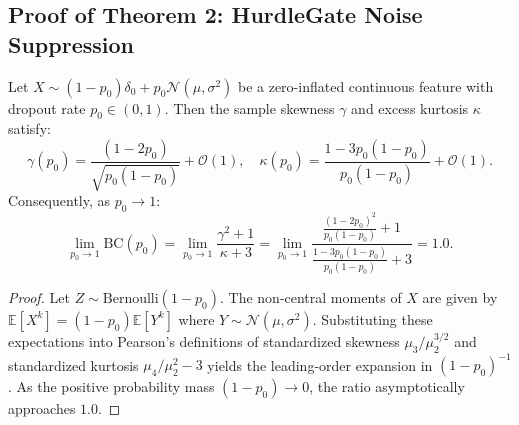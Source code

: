 \subsection{Proof of Theorem 2: HurdleGate Noise Suppression}

\begin{lemma}\label{lem:moment_divergence}
Let $X \sim (1 - p_0)\delta_0 + p_0 \mathcal{N}(\mu, \sigma^2)$ be a zero-inflated continuous feature with dropout rate $p_0 \in (0, 1)$. Then the sample skewness $\gamma$ and excess kurtosis $\kappa$ satisfy:
\begin{equation}
    \gamma(p_0) = \frac{(1 - 2p_0)}{\sqrt{p_0 (1 - p_0)}} + \mathcal{O}(1), \quad \kappa(p_0) = \frac{1 - 3p_0(1 - p_0)}{p_0(1 - p_0)} + \mathcal{O}(1).
\end{equation}
Consequently, as $p_0 \to 1$:
\begin{equation}
    \lim_{p_0 \to 1} \text{BC}(p_0) = \lim_{p_0 \to 1} \frac{\gamma^2 + 1}{\kappa + 3} = \lim_{p_0 \to 1} \frac{\frac{(1-2p_0)^2}{p_0(1-p_0)} + 1}{\frac{1 - 3p_0(1-p_0)}{p_0(1-p_0)} + 3} = 1.0.
\end{equation}
\end{lemma}

\begin{proof}
Let $Z \sim \text{Bernoulli}(1 - p_0)$. The non-central moments of $X$ are given by $\mathbb{E}[X^k] = (1 - p_0) \mathbb{E}[Y^k]$ where $Y \sim \mathcal{N}(\mu, \sigma^2)$. Substituting these expectations into Pearson's definitions of standardized skewness $\mu_3 / \mu_2^{3/2}$ and standardized kurtosis $\mu_4 / \mu_2^2 - 3$ yields the leading-order expansion in $(1 - p_0)^{-1}$. As the positive probability mass $(1 - p_0) \to 0$, the ratio asymptotically approaches $1.0$.
\end{proof}

